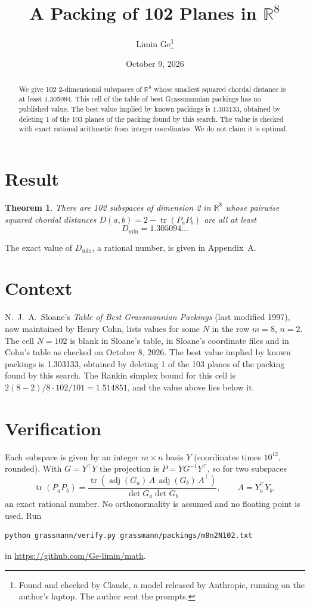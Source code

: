 \documentclass[11pt,a4paper]{article}
\title{A Packing of 102 Planes in $\mathbb{R}^{8}$}
\author{Limin Ge\thanks{Found and checked by Claude, a model released by Anthropic, running on the author's laptop. The author sent the prompts.}}
\date{October 9, 2026}
\newtheorem*{theorem}{Theorem}
\begin{document}
\maketitle
\begin{abstract}
We give 102 2-dimensional subspaces of $\mathbb{R}^{8}$ whose smallest squared chordal distance is at least 1.305094. This cell of the table of best Grassmannian packings has no published value. The best value implied by known packings is 1.303133, obtained by deleting 1 of the 103 planes of the packing found by this search. The value is checked with exact rational arithmetic from integer coordinates. We do not claim it is optimal.
\end{abstract}

\section{Result}
\begin{theorem}
There are 102 subspaces of dimension 2 in $\mathbb{R}^{8}$ whose pairwise squared chordal distances $D(a,b) = 2 - \operatorname{tr}(P_aP_b)$ are all at least
\[ D_{\min} = 1.305094\ldots \]
\end{theorem}
The exact value of $D_{\min}$, a rational number, is given in Appendix~A.


\section{Context}
N.~J.~A.~Sloane's \emph{Table of Best Grassmannian Packings} (last modified 1997), now maintained by Henry Cohn, lists values for some $N$ in the row $m=8$, $n=2$. The cell $N=102$ is blank in Sloane's table, in Sloane's coordinate files and in Cohn's table as checked on October 8, 2026. The best value implied by known packings is 1.303133, obtained by deleting 1 of the 103 planes of the packing found by this search. The Rankin simplex bound for this cell is $2(8-2)/8\cdot 102/101 = 1.514851$, and the value above lies below it.


\section{Verification}
Each subspace is given by an integer $m\times n$ basis $Y$ (coordinates times $10^{12}$, rounded). With $G=Y^\top Y$ the projection is $P=YG^{-1}Y^\top$, so for two subspaces
\[ \operatorname{tr}(P_aP_b)=\frac{\operatorname{tr}(\operatorname{adj}(G_a)\,A\,\operatorname{adj}(G_b)\,A^\top)}{\det G_a\det G_b},\qquad A=Y_a^\top Y_b, \]
an exact rational number. No orthonormality is assumed and no floating point is used. Run
\begin{verbatim}
python grassmann/verify.py grassmann/packings/m8n2N102.txt
\end{verbatim}
in \url{https://github.com/Ge-limin/math}.
\end{document}
